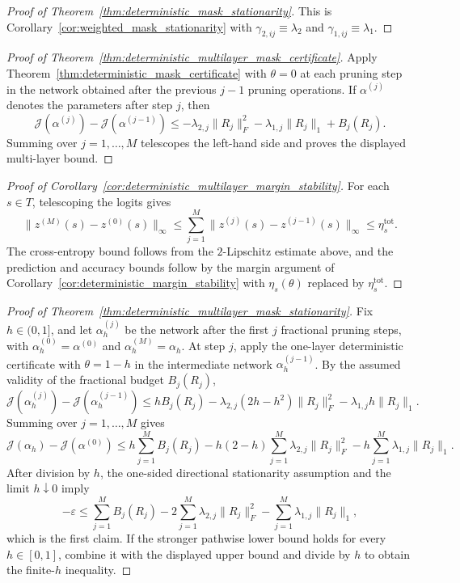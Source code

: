 \documentclass[11pt]{article}
\theoremstyle{plain}
\theoremstyle{definition}
\theoremstyle{remark}
\newcommand{\1}{\mathbf{1}}
\begin{document}
\begin{proof}[Proof of Theorem~\ref{thm:deterministic_mask_stationarity}]
This is Corollary~\ref{cor:weighted_mask_stationarity} with \(\gamma_{2,ij}\equiv\lambda_2\) and \(\gamma_{1,ij}\equiv\lambda_1\).
\end{proof}

\begin{proof}[Proof of Theorem~\ref{thm:deterministic_multilayer_mask_certificate}]
Apply Theorem~\ref{thm:deterministic_mask_certificate} with \(\theta=0\) at each pruning step in the network obtained after the previous \(j-1\) pruning operations. If \(\alpha^{(j)}\) denotes the parameters after step \(j\), then
\[
\mathcal J(\alpha^{(j)})-\mathcal J(\alpha^{(j-1)})
\le
-\lambda_{2,j}\|R_j\|_F^2
-\lambda_{1,j}\|R_j\|_1
+B_j(R_j).
\]
Summing over \(j=1,\dots,M\) telescopes the left-hand side and proves the displayed multi-layer bound.
\end{proof}

\begin{proof}[Proof of Corollary~\ref{cor:deterministic_multilayer_margin_stability}]
For each \(s\in T\), telescoping the logits gives
\[
\|z^{(M)}(s)-z^{(0)}(s)\|_\infty
\le
\sum_{j=1}^M\|z^{(j)}(s)-z^{(j-1)}(s)\|_\infty
\le
\eta_s^{\mathrm{tot}}.
\]
The cross-entropy bound follows from the \(2\)-Lipschitz estimate above, and the prediction and accuracy bounds follow by the margin argument of Corollary~\ref{cor:deterministic_margin_stability} with \(\eta_s(\theta)\) replaced by \(\eta_s^{\mathrm{tot}}\).
\end{proof}

\begin{proof}[Proof of Theorem~\ref{thm:deterministic_multilayer_mask_stationarity}]
Fix \(h\in(0,1]\), and let \(\alpha_h^{(j)}\) be the network after the first \(j\) fractional pruning steps, with \(\alpha_h^{(0)}=\alpha^{(0)}\) and \(\alpha_h^{(M)}=\alpha_h\). At step \(j\), apply the one-layer deterministic certificate with \(\theta=1-h\) in the intermediate network \(\alpha_h^{(j-1)}\). By the assumed validity of the fractional budget \(B_j(R_j)\),
\[
\mathcal J(\alpha_h^{(j)})-\mathcal J(\alpha_h^{(j-1)})
\le
hB_j(R_j)
-\lambda_{2,j}(2h-h^2)\|R_j\|_F^2
-\lambda_{1,j}h\|R_j\|_1.
\]
Summing over \(j=1,\dots,M\) gives
\[
\mathcal J(\alpha_h)-\mathcal J(\alpha^{(0)})
\le
h\sum_{j=1}^M B_j(R_j)
-h(2-h)\sum_{j=1}^M\lambda_{2,j}\|R_j\|_F^2
-h\sum_{j=1}^M\lambda_{1,j}\|R_j\|_1.
\]
After division by \(h\), the one-sided directional stationarity assumption and the limit \(h\downarrow0\) imply
\[
-\varepsilon
\le
\sum_{j=1}^M B_j(R_j)
-2\sum_{j=1}^M\lambda_{2,j}\|R_j\|_F^2
-\sum_{j=1}^M\lambda_{1,j}\|R_j\|_1,
\]
which is the first claim. If the stronger pathwise lower bound holds for every \(h\in[0,1]\), combine it with the displayed upper bound and divide by \(h\) to obtain the finite-\(h\) inequality.
\end{proof}
\end{document}
